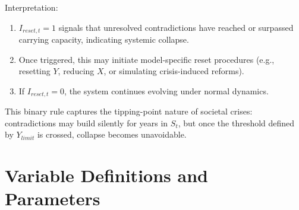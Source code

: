 \documentclass[12pt,a4paper]{article}
\begin{document}
\noindent Interpretation:
\begin{enumerate}
    \item $I_{reset,t} = 1$ signals that unresolved contradictions have reached or 
          surpassed carrying capacity, indicating systemic collapse.
    \item Once triggered, this may initiate model-specific reset procedures 
          (e.g., resetting $Y$, reducing $X$, or simulating crisis-induced reforms).
    \item If $I_{reset,t} = 0$, the system continues evolving under normal dynamics.
\end{enumerate}

\noindent This binary rule captures the tipping-point nature of societal crises: 
contradictions may build silently for years in $S_t$, but once the threshold 
defined by $Y_{limit}$ is crossed, collapse becomes unavoidable.


\section{Variable Definitions and Parameters}
\end{document}
